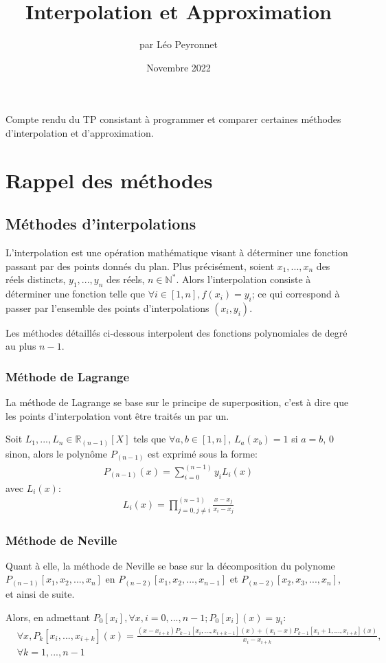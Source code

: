 \documentclass[10pt,a4paper,french]{article}
\author{par Léo Peyronnet}
\title{Interpolation et Approximation}
\date{Novembre 2022}
\begin{document}
\maketitle
Compte rendu du TP consistant à programmer et comparer certaines méthodes d'interpolation et d'approximation.
\section{Rappel des méthodes}
\subsection{Méthodes d'interpolations}
L'interpolation est une opération mathématique visant à déterminer une fonction passant par des points donnés du plan. Plus précisément, soient $x_1,...,x_n$ des réels distincts, $y_1,...,y_n$ des réels, $n \in \mathbb{N^*}$. Alors l'interpolation consiste à déterminer une fonction telle que $\forall i \in [1,n],f(x_i)=y_i$; ce qui correspond à passer par l'ensemble des points d'interpolations $(x_i,y_i)$.

Les méthodes détaillés ci-dessous interpolent des fonctions polynomiales de degré au plus $n-1$.
\subsubsection{Méthode de Lagrange}
La méthode de Lagrange se base sur le principe de superposition, c'est à dire que les points d'interpolation vont être traités un par un.

Soit $L_1,...,L_n \in \mathbb{R}_{(n-1)}[X]$ tels que $\forall a,b \in [1,n]$, $L_a(x_b)=1$ si $a=b$, $0$ sinon, alors le polynôme $P_{(n-1)}$ est exprimé sous la forme:
\begin{align*}
P_{(n-1)}(x)=\sum_{i=0}^{(n-1)}y_i L_i(x)
\end{align*}
avec $L_i(x)$:
\begin{align*}
L_i(x)=\prod_{j=0,j\neq i}^{(n-1)}\frac{x-x_j}{x_i-x_j}
\end{align*}
\subsubsection{Méthode de Neville}
Quant à elle, la méthode de Neville se base sur la décomposition du polynome $P_{(n-1)}[x_1,x_2,...,x_n]$ en $P_{(n-2)}[x_1,x_2,...,x_{n-1}]$ et $P_{(n-2)}[x_2,x_3,...,x_{n}]$, et ainsi de suite.

Alors, en admettant $P_0[x_i],\forall x,i=0,...,n-1 ; P_0[x_i](x)=y_i$:
{\tiny
\begin{align*}
&\forall x,P_{k}[x_i,...,x_{i+k}](x)=\frac{(x-x_{i+k})P_{k-1}[x_i,...,x_{i+k-1}](x)+(x_i-x)P_{k-1}[x_i+1,...,x_{i+k}](x)}{x_i-x_{i+k}},\\&\forall k=1,...,n-1
\end{align*}
}
\end{document}
